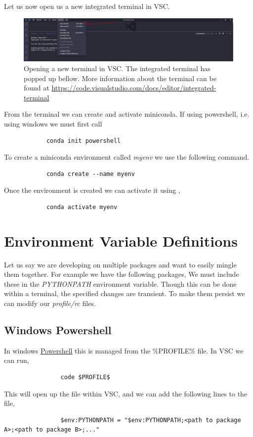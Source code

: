 \documentclass[10pt,a4paper]{article}
\begin{document}
		Let us now open us a new integrated terminal in VSC.
		\begin{figure}[h]
			\centering
			\includegraphics[scale=0.32]{figures/VSCTerminal.PNG}
			\caption{Opening a new terminal in VSC. The integrated terminal has popped up bellow. More information about the terminal can be found at \url{https://code.visualstudio.com/docs/editor/integrated-terminal}}
		\end{figure}
		
		From the terminal we can create and activate miniconda. If using powershell, i.e. using windows we must first call
		
		\begin{verbatim}
			conda init powershell
		\end{verbatim}
		
		To create a miniconda environment called \textit{myenv} we use the following command.
		
		\begin{verbatim}
			conda create --name myenv
		\end{verbatim}
		
		Once the environment is created we can activate it using ,
		\begin{verbatim}
			conda activate myenv
		\end{verbatim}
	\section{Environment Variable Definitions}
		Let us say we are developing on multiple packages and want to easily mingle them together. For example we have the following packages,
		We must include these in the \textit{PYTHONPATH} environment variable. Though this can be done within a terminal, the specified changes are transient. To make them persist we can modify our \textit{profile/rc} files. 
		\subsection{Windows Powershell}
			In windows \href{https://docs.microsoft.com/en-us/powershell/scripting/overview?view=powershell-7}{Powershell} this is managed from the \%PROFILE\% file. In VSC we can run,
			\begin{verbatim}
				code $PROFILE$
			\end{verbatim}
			This will open up the file within VSC, and we can add the following lines to the file,
			\begin{verbatim}
				$env:PYTHONPATH = "$env:PYTHONPATH;<path to package A>;<path to package B>;..."
			\end{verbatim}
\end{document}
